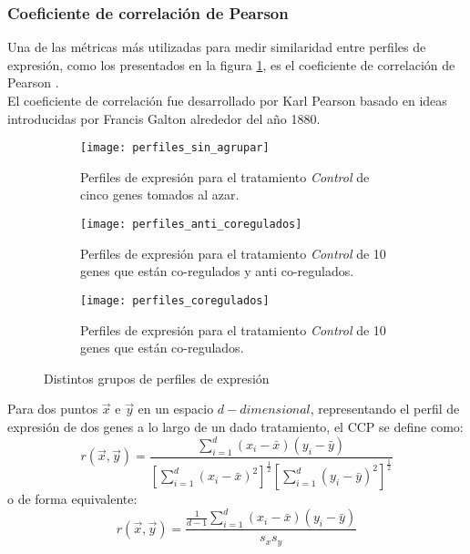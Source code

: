 \subsubsection{Coeficiente de correlación de Pearson}
Una de las métricas más utilizadas para medir similaridad entre perfiles de expresión, como los presentados en la figura \ref{fig:perfiles_sin_agrupar}, es el coeficiente de correlación de Pearson \cite{Babu2004}.\\
El coeficiente de correlación fue desarrollado por Karl Pearson basado en ideas introducidas por Francis Galton alrededor del año 1880.\\
\begin{figure*}[t!]
    \centering
    \begin{subfigure}[t]{0.6\textwidth}
    \centering
    \texttt{[image: perfiles\_sin\_agrupar]}
    \caption{Perfiles de expresión para el tratamiento \textit{Control} de cinco genes tomados al azar.}
    \label{fig:perfiles_sin_agrupar}
    \end{subfigure}    
    
    \begin{subfigure}[t]{0.45\textwidth}
    \centering
    \texttt{[image: perfiles\_anti\_coregulados]}
    \caption{Perfiles de expresión para el tratamiento \textit{Control} de 10 genes que están co-regulados y anti co-regulados.}
    \label{fig:perfiles_anti_coregulados}
    \end{subfigure}
    \begin{subfigure}[t]{0.45\textwidth}
    \centering
    \texttt{[image: perfiles\_coregulados]}
    \caption{Perfiles de expresión para el tratamiento \textit{Control} de 10 genes que están co-regulados.}
    \label{fig:perfiles_coregulados}
    \end{subfigure}
    \caption{Distintos grupos de perfiles de expresión}
\end{figure*}
Para dos puntos $\vec{x}$ e $\vec{y}$ en un espacio $d-dimensional$, representando el perfil de expresión de dos genes a lo largo de un dado tratamiento, el CCP se define como:
\begin{equation}
	r(\vec{x}, \vec{y}) = \frac{\sum\limits_{i=1}^d(x_i-\bar{x})(y_i-\bar{y})}{[\sum\limits_{i=1}^d(x_i-\bar{x})^2]^\frac{1}{2}[\sum\limits_{i=1}^d(y_i-\bar{y})^2]^\frac{1}{2}}
\end{equation}
o de forma equivalente:
\begin{equation}
	r(\vec{x}, \vec{y}) = \frac{\frac{1}{d-1}\sum\limits_{i=1}^d(x_i-\bar{x})(y_i-\bar{y})}{s_x s_y}
\end{equation}

